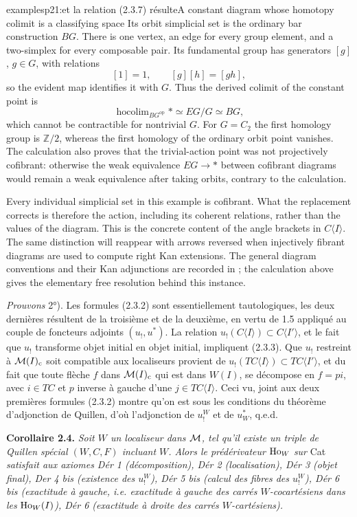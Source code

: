 \begin{dcomment}{examples}{p21:et la relation (2.3.7) résulte}{A constant diagram whose homotopy colimit is a classifying space}
Its orbit simplicial set is the ordinary bar construction $BG$. There is one vertex, an edge for every group element, and a two-simplex for every composable pair. Its fundamental group has generators $[g]$, $g\in G$, with relations
\[
 [1]=1,\qquad [g][h]=[gh],
\]
so the evident map identifies it with $G$. Thus the derived colimit of the constant point is
\[
 \operatorname{hocolim}_{BG^{\mathrm{op}}}*\simeq EG/G\simeq BG,
\]
which cannot be contractible for nontrivial $G$. For $G=C_2$ the first homology group is $\mathbb Z/2$, whereas the first homology of the ordinary orbit point vanishes. The calculation also proves that the trivial-action point was not projectively cofibrant: otherwise the weak equivalence $EG\to *$ between cofibrant diagrams would remain a weak equivalence after taking orbits, contrary to the calculation.

Every individual simplicial set in this example is cofibrant. What the replacement corrects is therefore the action, including its coherent relations, rather than the values of the diagram. This is the concrete content of the angle brackets in $C\langle I\rangle$. The same distinction will reappear with arrows reversed when injectively fibrant diagrams are used to compute right Kan extensions. The general diagram conventions and their Kan adjunctions are recorded in \citet[Definitions~A.2.8.1 and Proposition~A.2.8.7]{Lurie2009HTT}; the calculation above gives the elementary free resolution behind this instance.
\end{dcomment}


\textit{Prouvons} 2°). Les formules (2.3.2) sont essentiellement tautologiques, les deux dernières résultent de la troisième et de la deuxième, en vertu de 1.5 appliqué au couple de foncteurs adjoints $(u_!,u^*)$. La relation $u_!(C\langle I\rangle) \subset C\langle I'\rangle$, et le fait que $u_!$ transforme objet initial en objet initial, impliquent (2.3.3). Que $u_!$ restreint à $\mathcal{M}(I)_{\mathrm{c}}$ soit compatible aux localiseurs provient de $u_!(TC\langle I\rangle) \subset TC\langle I'\rangle$, et du fait que toute flèche $f$ dans $\mathcal{M}(I)_{\mathrm{c}}$ qui est dans $W(I)$, se décompose en $f = pi$, avec $i \in TC$ et $p$ inverse à gauche d'une $j \in TC\langle I\rangle$. Ceci vu, joint aux deux premières formules (2.3.2) montre qu'on est sous les conditions
du théorème d'adjonction de Quillen, d'où l'adjonction de $u_!^W$ et de $u^*_W$, q.e.d.

\textbf{Corollaire 2.4.} \textit{Soit $W$ un localiseur dans $\mathcal{M}$, tel qu'il existe un triple de Quillen spécial $(W,C,F)$ incluant $W$. Alors le prédérivateur} $\mathrm{Ho}_W$ \textit{sur} Cat \textit{satisfait aux axiomes Dér 1 (décomposition), Dér 2 (localisation), Dér 3 (objet final), Der 4 bis (existence des $u_!^W$), Dér 5 bis (calcul des fibres des $u_!^W$), Dér 6 bis (exactitude à gauche, i.e. exactitude à gauche des carrés $W$-cocartésiens dans les} $\mathrm{Ho}_W(I)$\textit{), Dér 6 (exactitude à droite des carrés $W$-cartésiens).} %

